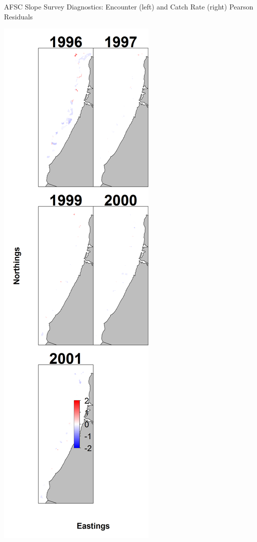 \documentclass[pdf]{beamer}\usepackage[]{graphicx}\usepackage[]{color}
\begin{document}
\begin{frame}{AFSC Slope Survey Diagnostics: Encounter (left) and Catch Rate (right) Pearson Residuals}
\begin{center}
  \includegraphics[scale = 0.15]{figures/AFSC_maps--catchrate_pearson_resid.png}
  \end{center}
\end{frame}
\end{document}
